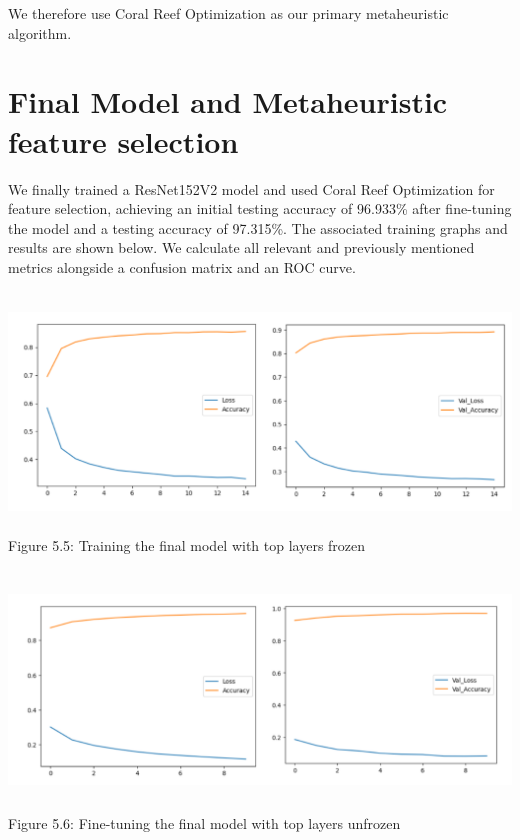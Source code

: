 We therefore use Coral Reef Optimization as our primary metaheuristic algorithm.

\section{Final Model and Metaheuristic feature selection}
We finally trained a ResNet152V2 model and used Coral Reef Optimization for feature selection, achieving an initial testing accuracy of 96.933\% after fine-tuning the model and a testing accuracy of 97.315\%. The associated training graphs and results are shown below. We calculate all relevant and previously mentioned metrics alongside a confusion matrix and an ROC curve.


\begin{center}
   \includegraphics[width=6in, height=2.5in]{images/5.5.png} 
   \\\fontsize{11pt}{24pt}	Figure 5.5: Training the final model with top layers frozen
\end{center}


\begin{center}
   \includegraphics[width=6in, height=2.5in]{images/5.6.png} 
   \\\fontsize{11pt}{24pt}	Figure 5.6: Fine-tuning the final model with top layers unfrozen
\end{center}
			
